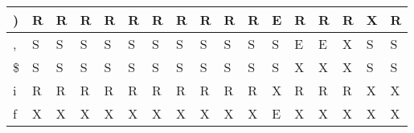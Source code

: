 \documentclass[a4paper]{article}
\begin{document}
\begin{table}[h]
\begin{tabular}{|l|l|l|l|l|l|l|l|l|l|l|l|l|l|l|l|l|}
)                     & R & R & R & R & R         & R            & R          & R             & R & R                     & E & R & R & R & X & R \\ \hline
,                     & S & S & S & S & S         & S            & S          & S             & S & S                     & S & E & E & X & S & S \\ \hline
\$                     & S & S & S & S & S         & S            & S          & S             & S & S                     & S & X & X & X & S & S \\ \hline
i                     & R & R & R & R & R         & R            & R          & R             & R & R                     & X & R & R & R & X & X \\ \hline
f                     & X & X & X & X & X         & X            & X          & X             & X & X                     & E & X & X & X & X & X \\ \hline
\end{tabular}
\end{table}
\end{document}
